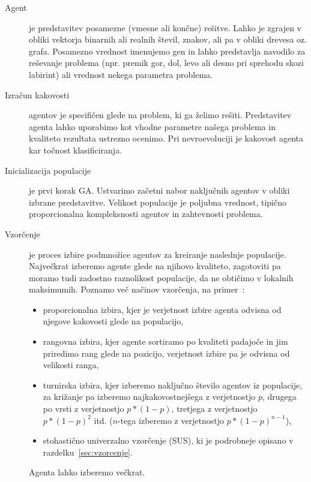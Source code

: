 \documentclass[a4paper,12pt,openright]{book}
\begin{document}
    \begin{description}
        \item[Agent]{je predstavitev posamezne (vmesne ali končne) rešitve. Lahko je zgrajen v obliki vektorja binarnih ali realnih
            števil, znakov, ali pa v obliki drevesa oz. grafa. Posamezno vrednost imenujemo gen in lahko predstavlja navodilo za
            reševanje problema (npr. premik gor, dol, levo ali desno pri sprehodu skozi labirint) ali vrednost nekega parametra problema.}
        \item[Izračun kakovosti]{agentov je specifičen glede na problem, ki ga želimo rešiti. Predstavitev agenta lahko uporabimo
            kot vhodne parametre našega problema in kvaliteto rezultata ustrezno ocenimo. Pri nevroevoluciji
            je kakovost agenta kar točnost klasificiranja.}
        \item[Inicializacija populacije]{je prvi korak GA.
            Ustvarimo začetni nabor naključnih agentov v obliki izbrane predstavitve.
            Velikost populacije je poljubna vrednost, tipično proporcionalna kompleksnosti agentov in zahtevnosti problema.}
        \item[Vzorčenje]{je proces izbire podmnožice agentov za kreiranje naslednje populacije.
            Največkrat izberemo agente glede na njihovo kvaliteto, zagotoviti pa moramo tudi zadostno raznolikost populacije,
            da ne obtičimo v lokalnih maksimumih. Poznamo več načinov vzorčenja, na primer~\cite{inteligentni_sistemi_2010}:
            \begin{itemize}
                \item proporcionalna izbira, kjer je verjetnost izbire agenta odvisna od njegove kakovosti glede na populacijo,
                \item rangovna izbira, kjer agente sortiramo po kvaliteti padajoče in jim priredimo rang glede na pozicijo, verjetnost izbire pa je odvisna od velikosti ranga,
                \item turnirska izbira, kjer izberemo naključno število agentov iz populacije, za križanje pa izberemo najkakovostnejšega
                z verjetnostjo $p$, drugega po vrsti z verjetnostjo $p*(1-p)$, tretjega z verjetnostjo $p*(1-p)^2$ itd.
                ($n$-tega izberemo z verjetnostjo $p*(1-p)^{n-1}$),
                \item stohastično univerzalno vzorčenje (SUS), ki je podrobneje opisano v razdelku~\ref{sec:vzorcenje}.
            \end{itemize}
            Agenta lahko izberemo večkrat.
}
\end{description}
\end{document}
